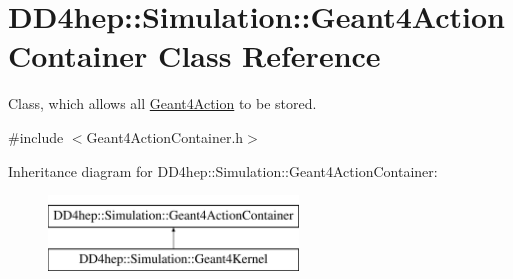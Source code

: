 \hypertarget{class_d_d4hep_1_1_simulation_1_1_geant4_action_container}{}\section{D\+D4hep\+:\+:Simulation\+:\+:Geant4\+Action\+Container Class Reference}
\label{class_d_d4hep_1_1_simulation_1_1_geant4_action_container}


Class, which allows all \hyperlink{class_d_d4hep_1_1_simulation_1_1_geant4_action}{Geant4\+Action} to be stored.  




{\ttfamily \#include $<$Geant4\+Action\+Container.\+h$>$}

Inheritance diagram for D\+D4hep\+:\+:Simulation\+:\+:Geant4\+Action\+Container\+:\begin{figure}[H]
\begin{center}
\leavevmode
\includegraphics[height=2.000000cm]{class_d_d4hep_1_1_simulation_1_1_geant4_action_container}
\end{center}
\end{figure}
